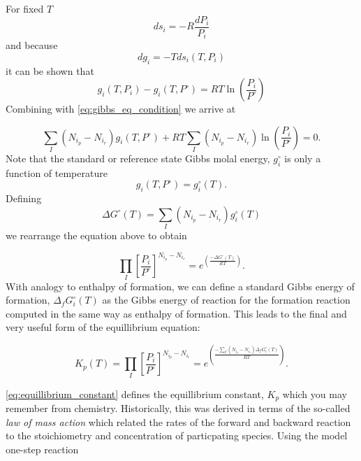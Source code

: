 \documentclass[twocolumn]{memoir} %
\begin{document}
For fixed $T$
%
\begin{equation*}
    ds_i = -R \frac{dP_i}{P_i}
\end{equation*}
%
and because 
\begin{equation*}
    dg_i = - Tds_i(T, P_i)
\end{equation*}
%
it can be shown that
\begin{equation}
    g_i(T, P_i) - g_i(T, P^\circ) = RT \ln\left(\frac{P_i}{P^\circ}\right)
\end{equation}
%
Combining with \cref{eq:gibbs_eq_condition} we arrive at

\begin{equation*}
    \sum_I(N_{i_p} - N_{i_r})g_i(T,P^\circ) + R T \sum_I(N_{i_p} - N_{i_r})\ln\left(\frac{P_i}{P^\circ}\right) = 0.
\end{equation*}
%
Note that the standard or reference state Gibbs molal energy, $g_i^\circ$ is only a function of temperature
\begin{equation*}
    g_i(T,P^\circ) = g_i^\circ(T).
\end{equation*}
%
Defining
\begin{equation*}
    \Delta G^\circ(T) = \sum\limits_I(N_{i_p} - N_{i_r})g_i^\circ(T)
\end{equation*}
%
we rearrange the equation above to obtain

\begin{equation*}
    \prod_I\left[\frac{P_i}{P^\circ}\right]^{N_{i_p}-N_{i_r}} = e^{\left(\frac{-\Delta G^\circ(T)}{RT}\right)}.
\end{equation*}
%
With analogy to enthalpy of formation, we can define a standard Gibbs energy of formation,
$\Delta_f G_i^\circ(T)$ as the Gibbs energy of reaction for the formation reaction computed in the same
way as enthalpy of formation.  This leads to the final and very useful form of the equillibrium equation:

\begin{equation}
    K_p(T) = \prod_I\left[\frac{P_i}{P^\circ}\right]^{N_{i_p}-N_{i_r}} = 
        e^{\left(\frac{-\sum\limits_I(N_{i_p} - N_{i_r})\Delta_f G_i^\circ(T)}{RT}\right)}.
    \label{eq:equillibrium_constant}
\end{equation}

\cref{eq:equillibrium_constant} defines the equillibrium constant, $K_p$ which you may remember
from chemistry.  Historically, this was derived in terms of the so-called \emph{law of mass action} 
which related the rates of
the forward and backward reaction to the stoichiometry and concentration of particpating species. 
Using the model one-step reaction
\end{document}
